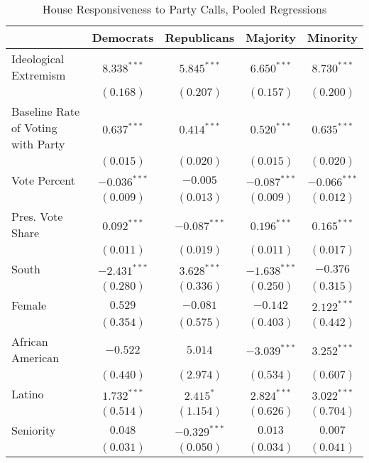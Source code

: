 \documentclass[12pt]{article}
\begin{document}
\begin{table}
	\begin{center}
		\caption{House Responsiveness to Party Calls, Pooled Regressions}
		\begin{tabular}{l c c c c }
			\hline
			& Democrats & Republicans & Majority & Minority \\
			\hline
			Ideological Extremism & $8.338^{***}$  & $5.845^{***}$  & $6.650^{***}$  & $8.730^{***}$  \\
			& $(0.168)$      & $(0.207)$      & $(0.157)$      & $(0.200)$      \\
			Baseline Rate of Voting with Party              & $0.637^{***}$  & $0.414^{***}$  & $0.520^{***}$  & $0.635^{***}$  \\
			& $(0.015)$      & $(0.020)$      & $(0.015)$      & $(0.020)$      \\
			Vote Percent                & $-0.036^{***}$ & $-0.005$       & $-0.087^{***}$ & $-0.066^{***}$ \\
			& $(0.009)$      & $(0.013)$      & $(0.009)$      & $(0.012)$      \\
			Pres. Vote Share          & $0.092^{***}$  & $-0.087^{***}$ & $0.196^{***}$  & $0.165^{***}$  \\
			& $(0.011)$      & $(0.019)$      & $(0.011)$      & $(0.017)$      \\
			South                  & $-2.431^{***}$ & $3.628^{***}$  & $-1.638^{***}$ & $-0.376$       \\
			& $(0.280)$      & $(0.336)$      & $(0.250)$      & $(0.315)$      \\
			Female                 & $0.529$        & $-0.081$       & $-0.142$       & $2.122^{***}$  \\
			& $(0.354)$      & $(0.575)$      & $(0.403)$      & $(0.442)$      \\
			African American                   & $-0.522$       & $5.014$        & $-3.039^{***}$ & $3.252^{***}$  \\
			& $(0.440)$      & $(2.974)$      & $(0.534)$      & $(0.607)$      \\
			Latino                 & $1.732^{***}$  & $2.415^{*}$    & $2.824^{***}$  & $3.022^{***}$  \\
			& $(0.514)$      & $(1.154)$      & $(0.626)$      & $(0.704)$      \\
			Seniority              & $0.048$        & $-0.329^{***}$ & $0.013$        & $0.007$        \\
			& $(0.031)$      & $(0.050)$      & $(0.034)$      & $(0.041)$      \\

\end{tabular}
\end{center}
\end{table}
\end{document}
